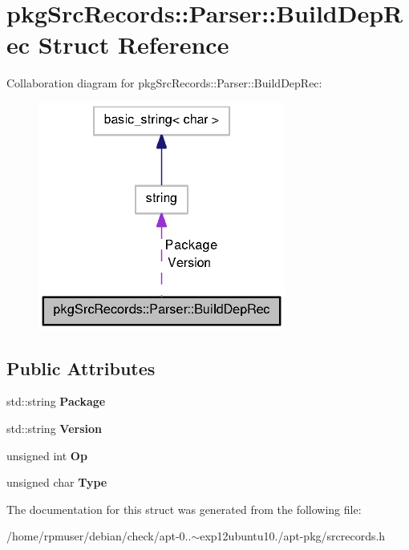 \section{pkg\-Src\-Records\-:\-:\-Parser\-:\-:\-Build\-Dep\-Rec \-Struct \-Reference}
\label{structpkgSrcRecords_1_1Parser_1_1BuildDepRec}


\-Collaboration diagram for pkg\-Src\-Records\-:\-:\-Parser\-:\-:\-Build\-Dep\-Rec\-:
\nopagebreak
\begin{figure}[H]
\begin{center}
\leavevmode
\includegraphics[width=230pt]{structpkgSrcRecords_1_1Parser_1_1BuildDepRec__coll__graph}
\end{center}
\end{figure}
\subsection*{\-Public \-Attributes}
\begin{DoxyCompactItemize}
\item 
std\-::string {\bfseries \-Package}\label{structpkgSrcRecords_1_1Parser_1_1BuildDepRec_a06226e54c9e5df60b2c5898e6e382929}

\item 
std\-::string {\bfseries \-Version}\label{structpkgSrcRecords_1_1Parser_1_1BuildDepRec_a9128f413b7890b2493b88f88fe258259}

\item 
unsigned int {\bfseries \-Op}\label{structpkgSrcRecords_1_1Parser_1_1BuildDepRec_ac03b7f1c89d4abc92f5c66ba3130748a}

\item 
unsigned char {\bfseries \-Type}\label{structpkgSrcRecords_1_1Parser_1_1BuildDepRec_aa8450776ab620f8870aaee14ac1747fe}

\end{DoxyCompactItemize}


\-The documentation for this struct was generated from the following file\-:\begin{DoxyCompactItemize}
\item 
/home/rpmuser/debian/check/apt-\/0..$\sim$exp12ubuntu10./apt-\/pkg/srcrecords.\-h\end{DoxyCompactItemize}
